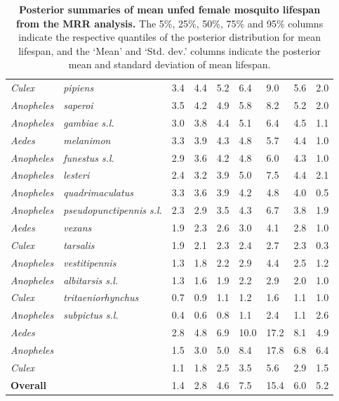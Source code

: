 \documentclass[12pt]{article}
\begin{document}
\begin{table}[htbp]
\begin{tabular}{l|l|l|l|l|l|l|l|l}
		\textit{Culex} & \textit{pipiens} & 3.4 & 4.4 & 5.2 & 6.4 & 9.0 & 5.6 & 2.0 \\
		\textit{Anopheles} & \textit{saperoi} & 3.5 & 4.2 & 4.9 & 5.8 & 8.2 & 5.2 & 2.0 \\
		\textit{Anopheles} & \textit{gambiae s.l.} & 3.0 & 3.8 & 4.4 & 5.1 & 6.4 & 4.5 & 1.1 \\
		\textit{Aedes} & \textit{melanimon} & 3.3 & 3.9 & 4.3 & 4.8 & 5.7 & 4.4 & 1.0 \\
		\textit{Anopheles} & \textit{funestus s.l.} & 2.9 & 3.6 & 4.2 & 4.8 & 6.0 & 4.3 & 1.0 \\
		\textit{Anopheles} & \textit{lesteri} & 2.4 & 3.2 & 3.9 & 5.0 & 7.5 & 4.4 & 2.1 \\
		\textit{Anopheles} & \textit{quadrimaculatus} & 3.3 & 3.6 & 3.9 & 4.2 & 4.8 & 4.0 & 0.5 \\
		\textit{Anopheles} & \textit{pseudopunctipennis s.l.} & 2.3 & 2.9 & 3.5 & 4.3 & 6.7 & 3.8 & 1.9 \\
		\textit{Aedes} & \textit{vexans} & 1.9 & 2.3 & 2.6 & 3.0 & 4.1 & 2.8 & 1.0 \\
		\textit{Culex} & \textit{tarsalis} & 1.9 & 2.1 & 2.3 & 2.4 & 2.7 & 2.3 & 0.3 \\
		\textit{Anopheles} & \textit{vestitipennis} & 1.3 & 1.8 & 2.2 & 2.9 & 4.4 & 2.5 & 1.2 \\
		\textit{Anopheles} & \textit{albitarsis s.l.} & 1.3 & 1.6 & 1.9 & 2.2 & 2.9 & 2.0 & 1.0 \\
		\textit{Culex} & \textit{tritaeniorhynchus} & 0.7 & 0.9 & 1.1 & 1.2 & 1.6 & 1.1 & 1.0 \\
		\textit{Anopheles} & \textit{subpictus s.l.} & 0.4 & 0.6 & 0.8 & 1.1 & 2.4 & 1.1 & 2.6 \\
		\hline
		\textit{Aedes} & \text{} & 2.8 & 4.8 & 6.9 & 10.0 & 17.2 & 8.1 & 4.9 \\
		\textit{Anopheles} & \text{} & 1.5 & 3.0 & 5.0 & 8.4 & 17.8 & 6.8 & 6.4 \\
		\textit{Culex} & \text{} & 1.1 & 1.8 & 2.5 & 3.5 & 5.6 & 2.9 & 1.5 \\
		\hline
		\textbf{Overall} & \text{} & 1.4 & 2.8 & 4.6 & 7.5 & 15.4 & 6.0 & 5.2 \\
	\end{tabular}
	\caption{\textbf{Posterior summaries of mean unfed female mosquito lifespan from the MRR analysis.} The 5\%, 25\%, 50\%, 75\% and 95\% columns indicate the respective quantiles of the posterior distribution for mean lifespan, and the `Mean' and `Std. dev.' columns indicate the posterior mean and standard deviation of mean lifespan.}
	\label{tab:mrr_estimated_lifespans}%
\end{table}%
\end{document}
